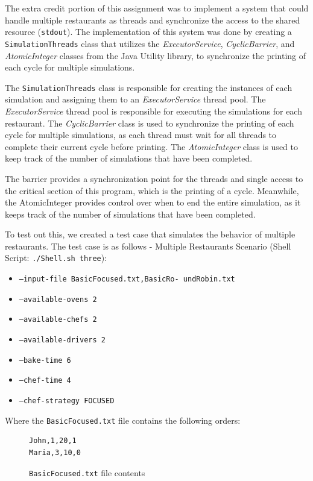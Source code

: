 \documentclass[conference]{IEEEtran}
\begin{document}
The extra credit portion of this assignment was to implement a system that could handle multiple restaurants as threads and synchronize the access to the shared resource (\texttt{stdout}). The implementation of this system was done by creating a \texttt{SimulationThreads} class that utilizes the \textit{ExecutorService}, \textit{CyclicBarrier}, and \textit{AtomicInteger} classes from the Java Utility library, to synchronize the printing of each cycle for multiple simulations. 

The \texttt{SimulationThreads} class is responsible for creating the instances of each simulation and assigning them to an \textit{ExecutorService} thread pool. The \textit{ExecutorService} thread pool is responsible for executing the simulations for each restaurant. The \textit{CyclicBarrier} class is used to synchronize the printing of each cycle for multiple simulations, as each thread must wait for all threads to complete their current cycle before printing. The \textit{AtomicInteger} class is used to keep track of the number of simulations that have been completed.

The barrier provides a synchronization point for the threads and single access to the critical section of this program, which is the printing of a cycle. Meanwhile, the AtomicInteger provides control over when to end the entire simulation, as it keeps track of the number of simulations that have been completed.

To test out this, we created a test case that simulates the behavior of multiple restaurants. The test case is as follows - Multiple Restaurants Scenario (Shell Script: \texttt{./Shell.sh three}):
\begin{itemize}
    \item \texttt{--input-file BasicFocused.txt,BasicRo-
    undRobin.txt}
    \item \texttt{--available-ovens 2}
    \item \texttt{--available-chefs 2} 
    \item \texttt{--available-drivers 2}
    \item \texttt{--bake-time 6}
    \item \texttt{--chef-time 4}
    \item \texttt{--chef-strategy FOCUSED}
\end{itemize}

Where the \texttt{BasicFocused.txt} file contains the following orders:
\begin{figure}[H]
    \centering
    \begin{lstlisting}[style=input, frame=single]
John,1,20,1
Maria,3,10,0
    \end{lstlisting}
    \caption{\centering \texttt{BasicFocused.txt} file contents}
    \label{fig:orders2}
\end{figure}
\end{document}
